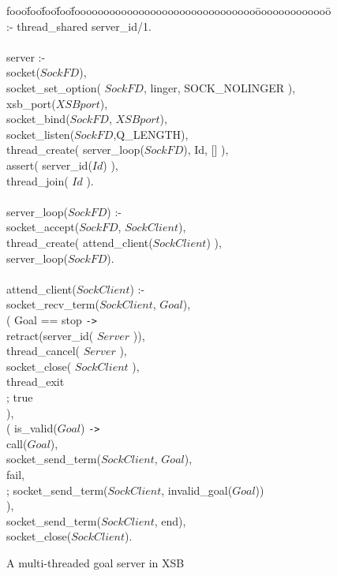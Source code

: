 \begin{figure}
\begin{center}
\begin{tt}
\begin{tabbing}
fooo\=foo\=foo\=foo\=fooooooooooooooooooooooooooooooo\=ooooooooooooo\=\kill
\> :- thread\_shared server\_id/1. \\
\\
\> server :-\\
\> \> socket($SockFD$),\\
\> \> socket\_set\_option( $SockFD$, linger, SOCK\_NOLINGER ),\\
\> \> xsb\_port($XSBport$),\\
\> \> socket\_bind($SockFD$, $XSBport$),\\
\> \> socket\_listen($SockFD$,Q\_LENGTH),\\
\> \> thread\_create( server\_loop($SockFD$), Id, [] ),\\
\> \> assert( server\_id($Id$) ),\\
\> \> thread\_join( $Id$ ).\\
\\
\> server\_loop($SockFD$) :-\\
\> \> socket\_accept($SockFD$, $SockClient$),\\
\> \> thread\_create( attend\_client($SockClient$) ),\\
\> \> server\_loop($SockFD$).\\
\\
\> attend\_client($SockClient$) :-\\
\> \> socket\_recv\_term($SockClient$, $Goal$),\\
\> \> ( \> Goal == stop \verb|->| \\
\> \> \> retract(server\_id( $Server$ )),\\
\> \> \> thread\_cancel( $Server$ ),\\
\> \> \> socket\_close( $SockClient$ ),\\
\> \> \> thread\_exit\\
\> \> ; \> true\\
\> \> ),\\
\> \> ( \> is\_valid($Goal$) \verb|->|\\
\> \> \> call($Goal$), \\
\> \> \> socket\_send\_term($SockClient$, $Goal$),\\
\> \> \> fail,\\
\> \> ;	\> socket\_send\_term($SockClient$, invalid\_goal($Goal$))\\
\> \> ),\\
\> \> socket\_send\_term($SockClient$, end),\\
\> \> socket\_close($SockClient$).
\end{tabbing}
\end{tt}
\end{center}
\caption{A multi-threaded goal server in XSB}
\label{fig:ex-server}
\end{figure}

